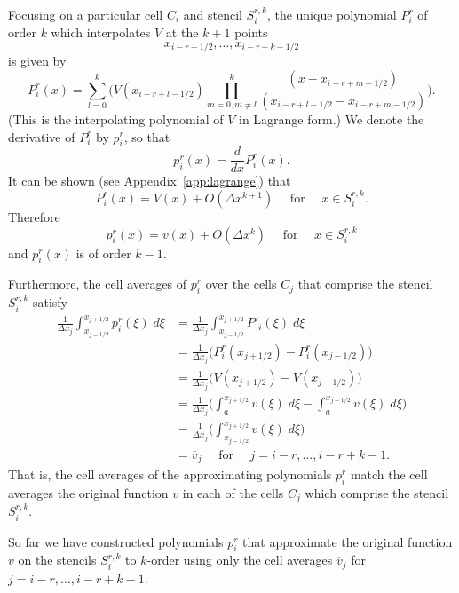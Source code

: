 \documentclass{article}
\newcommand{\dd}[2]{\frac{d #1}{d #2}}
\newcommand{\for}[0]{\quad \text{ for } \quad}
\newcommand{\xlj}[0]{x_{j-1/2}}
\newcommand{\xrj}[0]{x_{j+1/2}}
\numberwithin{equation}{section}
\begin{document}
Focusing on a particular cell $C_i$ and stencil $S_i^{r,k}$, the
unique polynomial $P^r_i$ of order $k$ which interpolates $V$ at the
$k+1$ points
\begin{equation*}
  x_{i-r-1/2}, \ldots, x_{i-r+k-1/2}
\end{equation*}
is given by
\begin{equation}
  \label{eq:P}
  P^r_i(x) = \sum_{l=0}^{k} \Biggl(
    V(x_{i-r+l-1/2}) \prod_{m=0, m \neq l}^{k}
      \frac{(x - x_{i-r+m-1/2})}{(x_{i-r+l-1/2} - x_{i-r+m-1/2})}
    \Biggr).
\end{equation}
(This is the interpolating polynomial of $V$ in Lagrange form.)  We
denote the derivative of $P^r_i$ by $p^r_i$, so that
\begin{equation*}
  p^r_i(x) = \dd{}{x} P^r_i(x).
\end{equation*}
It can be shown (see Appendix~\ref{app:lagrange}) that
\begin{equation*}
  P^r_i(x) = V(x) + O(\Delta x^{k+1}) \for x \in S_i^{r,k}.
\end{equation*}
Therefore
\begin{equation*}
  p^r_i(x) = v(x) + O(\Delta x^k) \for x \in S_i^{r,k}
\end{equation*}
and $p^r_i(x)$ is of order $k-1$.

Furthermore, the cell averages of $p^r_i$ over the cells $C_j$ that
comprise the stencil $S_i^{r,k}$ satisfy
\begin{align*}
  \frac{1}{\Delta x_j} \int_{\xlj}^{\xrj} p^r_i(\xi) \;d\xi
    &= \frac{1}{\Delta x_j} \int_{\xlj}^{\xrj} P'_i(\xi) \;d\xi \\
    &= \frac{1}{\Delta x_j} \biggl( P^r_i(\xrj) - P^r_i(\xlj) \biggr) \\
    &= \frac{1}{\Delta x_j} \biggl( V(\xrj) - V(\xlj) \biggr) \\
    &= \frac{1}{\Delta x_j} \biggl( \int_a^{\xrj} v(\xi) \;d\xi
      - \int_a^{\xlj} v(\xi) \;d\xi \biggr) \\
    &= \frac{1}{\Delta x_j} \biggl(
      \int_{\xlj}^{\xrj} v(\xi) \;d\xi \biggr) \\
    &= \overline{v}_j \for j=i-r,\ldots,i-r+k-1.
\end{align*}
That is, the cell averages of the approximating polynomials $p^r_i$
match the cell averages the original function $v$ in each of the cells
$C_j$ which comprise the stencil $S_i^{r,k}$.

So far we have constructed polynomials $p^r_i$ that approximate the
original function $v$ on the stencils $S_{i}^{r,k}$ to $k$-order using
only the cell averages $\overline{v}_j$ for $j=i-r,\ldots,i-r+k-1$.
\end{document}
